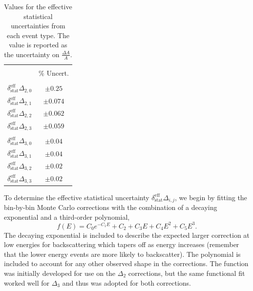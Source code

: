 \setlength{\tabcolsep}{12pt}

\begin{table}[h]
  \caption{Values for the effective statistical uncertainties from each
  event type. The value is reported as the uncertainty on $\frac{\Delta A}{A}$.} 
  \centering
  \begin{tabular}{l c }
    \hline \hline \\ [-1.75ex]
    & \% Uncert. \\
    \hline \\ [-1.75ex]
    $\delta^{\mathrm{eff}}_{\mathrm{stat}}\Delta_{2,0}$ & $\pm0.25$ \\ [0.50ex]
    $\delta^{\mathrm{eff}}_{\mathrm{stat}}\Delta_{2,1}$ & $\pm0.074$ \\ [0.50ex]
    $\delta^{\mathrm{eff}}_{\mathrm{stat}}\Delta_{2,2}$ & $\pm0.062$ \\ [0.50ex]
    $\delta^{\mathrm{eff}}_{\mathrm{stat}}\Delta_{2,3}$ & $\pm0.059$  \\ [0.50ex]
    \hline \\ [-1.75ex]
    $\delta^{\mathrm{eff}}_{\mathrm{stat}}\Delta_{3,0}$ & $\pm0.04$ \\ [0.50ex]
    $\delta^{\mathrm{eff}}_{\mathrm{stat}}\Delta_{3,1}$ & $\pm0.04$ \\ [0.50ex]
    $\delta^{\mathrm{eff}}_{\mathrm{stat}}\Delta_{3,2}$ & $\pm0.02$ \\ [0.50ex]
    $\delta^{\mathrm{eff}}_{\mathrm{stat}}\Delta_{3,3}$ & $\pm0.02$  \\ [0.50ex]
    \hline
  \end{tabular}
  \label{tab:effStat}
\end{table}

To determine the effective statistical uncertainty $\delta^{\mathrm{eff}}_{\mathrm{stat}}\Delta_{i,j}$,
we begin by fitting the bin-by-bin Monte Carlo corrections with the combination of a decaying exponential
and a third-order polynomial,
%
\begin{equation}
  f(E) = C_0 e^{-C_1E} + C_2 + C_3E + C_4E^2 + C_5E^3.
\end{equation}
%
The decaying exponential is included to describe the expected larger correction at low
energies for backscattering which tapers off as energy increases (remember that the lower
energy events are more likely to backscatter). The polynomial is included to account for
any other observed shape in the corrections. The function was initially developed for use
on the $\Delta_{\mathrm{2}}$ corrections, but the same functional fit worked well for
$\Delta_{\mathrm{3}}$ and thus was adopted for both corrections.

